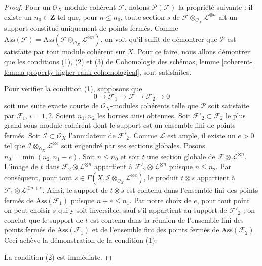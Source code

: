 \begin{proof}
Pour un $\mathcal{O}_X$-module cohérent $\mathcal{F}$,
notons $\mathcal{P}(\mathcal{F})$ la propriété suivante : il
existe un $n_0 \in \mathbf{Z}$ tel que, pour $n \leq n_0$,
toute section $s$ de
$\mathcal{F} \otimes_{\mathcal{O}_X} \mathcal{L}^{\otimes n}$
ait un support constitué uniquement de points fermés.
Comme $\text{Ass}(\mathcal{F}) =
\text{Ass}(\mathcal{F} \otimes_{\mathcal{O}_X} \mathcal{L}^{\otimes n})$,
on voit qu'il suffit de démontrer que $\mathcal{P}$
est satisfaite par tout module cohérent sur $X$.
Pour ce faire, nous allons démontrer que les conditions (1), (2) et (3) de
Cohomologie des schémas, lemme
\ref{coherent-lemma-property-higher-rank-cohomological},
sont satisfaites.

\medskip\noindent
Pour vérifier la condition (1), supposons que
$$
0 \to \mathcal{F}_1 \to \mathcal{F} \to \mathcal{F}_2 \to 0
$$
soit une suite exacte courte de $\mathcal{O}_X$-modules cohérents
telle que $\mathcal{P}$ soit satisfaite par $\mathcal{F}_i$, $i = 1, 2$.
Soient $n_1, n_2$ les bornes ainsi obtenues.
Soit $\mathcal{F}'_2 \subset \mathcal{F}_2$ le plus grand
sous-module cohérent dont le support est un ensemble fini de points
fermés. Soit $\mathcal{I} \subset \mathcal{O}_X$ l'annulateur
de $\mathcal{F}'_2$. Comme $\mathcal{L}$ est ample, il existe un $e > 0$
tel que $\mathcal{I} \otimes_{\mathcal{O}_X} \mathcal{L}^{\otimes e}$
soit engendré par ses sections globales. Posons $n_0 = \min(n_2, n_1 - e)$. Soit $n \leq n_0$
et soit $t$ une section globale de
$\mathcal{F} \otimes \mathcal{L}^{\otimes n}$.
L'image de $t$ dans $\mathcal{F}_2 \otimes \mathcal{L}^{\otimes n}$
appartient à $\mathcal{F}'_2 \otimes \mathcal{L}^{\otimes n}$ puisque
$n \leq n_2$. Par conséquent, pour tout
$s \in \Gamma(X, \mathcal{I} \otimes_{\mathcal{O}_X} \mathcal{L}^{\otimes e})$,
le produit $t \otimes s$ appartient à
$\mathcal{F}_1 \otimes \mathcal{L}^{\otimes n + e}$.
Ainsi, le support de $t \otimes s$ est contenu dans
l'ensemble fini des points fermés de $\text{Ass}(\mathcal{F}_1)$
puisque $n + e \leq n_1$. Par notre choix de $e$,
pour tout point on peut choisir $s$ qui y soit inversible, sauf s'il
appartient au support de $\mathcal{F}'_2$ ;
on conclut que le support de $t$ est contenu dans la réunion de
l'ensemble fini des points fermés de $\text{Ass}(\mathcal{F}_1)$ et de
l'ensemble fini des points fermés de $\text{Ass}(\mathcal{F}_2)$.
Ceci achève la démonstration de la condition (1).

\medskip\noindent
La condition (2) est immédiate.


\end{proof}
